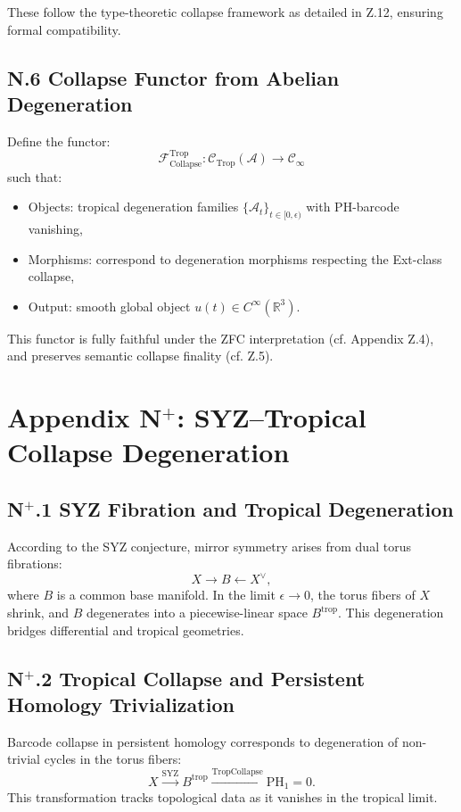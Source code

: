 \documentclass[11pt]{article}
\begin{document}
\begin{axiom}
\begin{axiom}
{{These follow the type-theoretic collapse framework as detailed in Z.12, ensuring formal compatibility.

\subsection*{N.6 Collapse Functor from Abelian Degeneration}

Define the functor:
\[
\mathcal{F}^{\mathrm{Trop}}_{\text{Collapse}}: \mathcal{C}_{\text{Trop}}(\mathcal{A}) \to \mathcal{C}_\infty
\]
such that:
\begin{itemize}
  \item Objects: tropical degeneration families \( \{ \mathcal{A}_t \}_{t \in [0,\epsilon)} \) with PH-barcode vanishing,
  \item Morphisms: correspond to degeneration morphisms respecting the Ext-class collapse,
  \item Output: smooth global object \( u(t) \in C^\infty(\mathbb{R}^3) \).
\end{itemize}

This functor is fully faithful under the ZFC interpretation (cf. Appendix Z.4),  
and preserves semantic collapse finality (cf. Z.5).



\section*{Appendix N$^+$: SYZ–Tropical Collapse Degeneration}

\subsection*{N$^+$.1 SYZ Fibration and Tropical Degeneration}
According to the SYZ conjecture, mirror symmetry arises from dual torus fibrations:
\[
X \to B \leftarrow X^\vee,
\]
where \( B \) is a common base manifold. In the limit \( \epsilon \to 0 \), the torus fibers of \( X \) shrink, and \( B \) degenerates into a piecewise-linear space \( B^{\mathrm{trop}} \). This degeneration bridges differential and tropical geometries.

\subsection*{N$^+$.2 Tropical Collapse and Persistent Homology Trivialization}
Barcode collapse in persistent homology corresponds to degeneration of non-trivial cycles in the torus fibers:
\[
X \xrightarrow{\mathrm{SYZ}} B^{\mathrm{trop}} \xrightarrow{\mathrm{TropCollapse}} \mathrm{PH}_1 = 0.
\]
This transformation tracks topological data as it vanishes in the tropical limit.

}}
\end{axiom}
\end{axiom}
\end{document}
